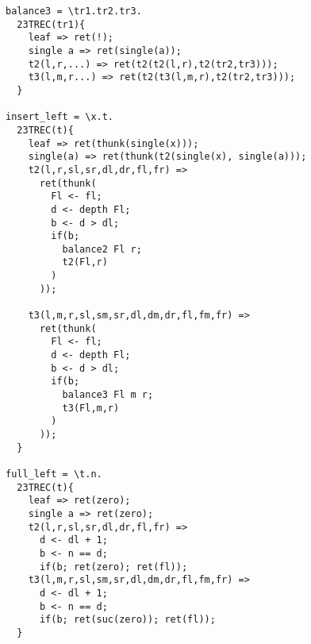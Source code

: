 \begin{itemize}
\begin{verbatim}
balance3 = \tr1.tr2.tr3.
  23TREC(tr1){
    leaf => ret(!);
    single a => ret(single(a));
    t2(l,r,...) => ret(t2(t2(l,r),t2(tr2,tr3)));
    t3(l,m,r...) => ret(t2(t3(l,m,r),t2(tr2,tr3)));
  }

insert_left = \x.t. 
  23TREC(t){
    leaf => ret(thunk(single(x)));
    single(a) => ret(thunk(t2(single(x), single(a)));
    t2(l,r,sl,sr,dl,dr,fl,fr) => 
      ret(thunk(
        Fl <- fl; 
        d <- depth Fl;
        b <- d > dl;
        if(b; 
          balance2 Fl r;
          t2(Fl,r)
        )
      ));

    t3(l,m,r,sl,sm,sr,dl,dm,dr,fl,fm,fr) => 
      ret(thunk(
        Fl <- fl; 
        d <- depth Fl;
        b <- d > dl;
        if(b; 
          balance3 Fl m r;
          t3(Fl,m,r)
        )
      ));
  }

full_left = \t.n. 
  23TREC(t){
    leaf => ret(zero);
    single a => ret(zero);
    t2(l,r,sl,sr,dl,dr,fl,fr) => 
      d <- dl + 1;
      b <- n == d;
      if(b; ret(zero); ret(fl));
    t3(l,m,r,sl,sm,sr,dl,dm,dr,fl,fm,fr) => 
      d <- dl + 1;
      b <- n == d;
      if(b; ret(suc(zero)); ret(fl));
  }



\end{verbatim}
\end{itemize}
